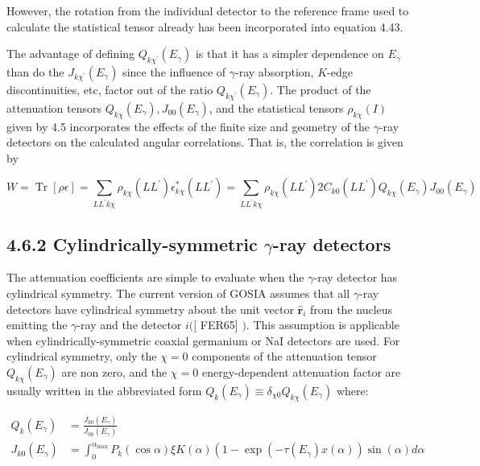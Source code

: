 \documentclass[10pt]{article}
\begin{document}
However, the rotation from the individual detector to the reference frame used to calculate the statistical tensor already has been incorporated into equation 4.43.

The advantage of defining $Q_{k \chi^{\prime}}\left(E_{\gamma}\right)$ is that it has a simpler dependence on $E_{\gamma}$ than do the $J_{k \chi^{\prime}}\left(E_{\gamma}\right)$ since the influence of $\gamma$-ray absorption, $K$-edge discontinuities, etc, factor out of the ratio $Q_{k \chi^{\prime}}\left(E_{\gamma}\right)$. The product of the attenuation tensors $Q_{k \chi}\left(E_{\gamma}\right), J_{00}\left(E_{\gamma}\right)$, and the statistical tensors $\rho_{k \chi}(I)$ given by 4.5 incorporates the effects of the finite size and geometry of the $\gamma$-ray detectors on the calculated angular correlations. That is, the correlation is given by


\begin{equation*}
W=\operatorname{Tr}[\rho \epsilon]=\sum_{L L^{\prime} k \chi} \rho_{k \chi}\left(L L^{\prime}\right) \epsilon_{k \chi}^{*}\left(L L^{\prime}\right)=\sum_{L L^{\prime} k \chi} \rho_{k \chi}\left(L L^{\prime}\right) 2 C_{k 0}\left(L L^{\prime}\right) Q_{k \chi}\left(E_{\gamma}\right) J_{00}\left(E_{\gamma}\right) \tag{4.48}
\end{equation*}


\subsection*{4.6.2 Cylindrically-symmetric $\gamma$-ray detectors}
The attenuation coefficients are simple to evaluate when the $\gamma$-ray detector has cylindrical symmetry. The current version of GOSIA assumes that all $\gamma$-ray detectors have cylindrical symmetry about the unit vector $\hat{\mathbf{r}}_{i}$ from the nucleus emitting the $\gamma$-ray and the detector $i([$ FER65] $)$. This assumption is applicable when cylindrically-symmetric coaxial germanium or NaI detectors are used. For cylindrical symmetry, only the $\chi=0$ components of the attenuation tensor $Q_{k \chi}\left(E_{\gamma}\right)$ are non zero, and the $\chi=0$ energy-dependent attenuation factor are usually written in the abbreviated form $Q_{k}\left(E_{\gamma}\right) \equiv \delta_{\chi 0} Q_{k \chi}\left(E_{\gamma}\right)$ where:


\begin{align*}
Q_{k}\left(E_{\gamma}\right) & =\frac{J_{k 0}\left(E_{\gamma}\right)}{J_{00}\left(E_{\gamma}\right)}  \tag{4.49}\\
J_{k 0}\left(E_{\gamma}\right) & =\int_{0}^{\alpha_{\max }} P_{k}(\cos \alpha) \xi K(\alpha)\left(1-\exp \left(-\tau\left(E_{\gamma}\right) x(\alpha)\right) \sin (\alpha) d \alpha\right. \tag{4.50}
\end{align*}
\end{document}
